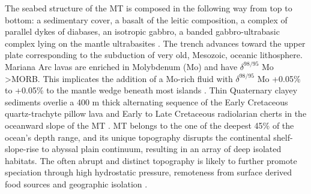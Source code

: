 \documentclass[11pt,a4paper]{report}
\begin{document}
The seabed structure of the \ac{MT} is composed in the following way from top to bottom: a sedimentary cover, a basalt of the leitic composition, a complex of parallel dykes of diabases, an isotropic gabbro, a banded gabbro-ultrabasic complex lying on the mantle ultrabasites \cite{Butuzova2003}. The trench advances toward the upper plate corresponding to the subduction of very old, Mesozoic, oceanic lithosphere. Mariana Arc lavas are enriched in Molybdenum (Mo) and have $\delta^{98/95}$ Mo >\ac{MORB}. This implicates the addition of a Mo-rich fluid with $\delta^{98/95}$ Mo \texttildelow{} +0.05\% to +0.05\% to the mantle wedge beneath most islands \cite{Freymuthetal2015}. Thin Quaternary clayey sediments overlie a 400 m thick alternating sequence of the Early Cretaceous quartz-trachyte pillow lava and Early to Late Cretaceous radiolarian cherts in the oceanward slope of the \ac{MT} \cite{Hiranoetal2002}. \ac{MT} belongs to the one of the deepest 45\% of the ocean’s depth range, and its unique topography disrupts the continental shelf-slope-rise to abyssal plain continuum, resulting in an array of deep isolated habitats. The often abrupt and distinct topography is likely to further promote speciation through high hydrostatic pressure, remoteness from surface derived food sources and geographic isolation \cite{Eustaceetal2016}. 

\end{document}

